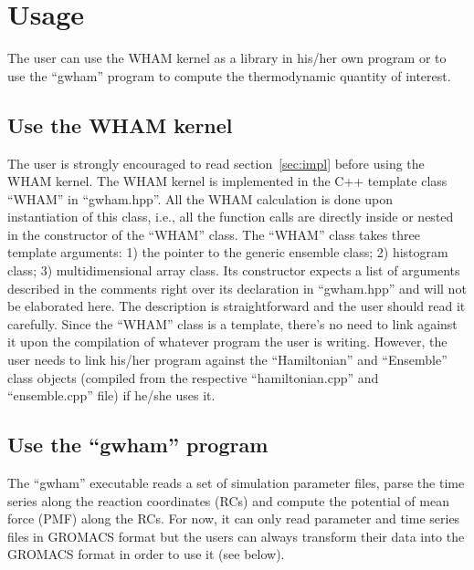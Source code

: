 \section{Usage} \label{sec:usage}
The user can use the WHAM kernel as a library in his/her own
program or to use the ``gwham'' program to compute the thermodynamic
quantity of interest. 

\subsection{Use the WHAM kernel}
The user is strongly encouraged to read section~\ref{sec:impl} before using the
WHAM kernel. The WHAM kernel is implemented in the C++ template class ``WHAM''
in ``gwham.hpp''. All the WHAM calculation is done upon instantiation of this
class, i.e., all the function calls are directly inside or nested in the
constructor of the ``WHAM'' class. The ``WHAM'' class takes three template
arguments: 1) the pointer to the generic ensemble class; 2) histogram class; 3)
multidimensional array class. Its constructor expects a list of arguments
described in the comments right over its declaration in ``gwham.hpp'' and will
not be elaborated here. The description is straightforward and the user should
read it carefully. Since the ``WHAM'' class is a template, there's no need to 
link against it upon the compilation of whatever program the user is writing. 
However, the user needs to link his/her program against the ``Hamiltonian'' 
and ``Ensemble'' class objects (compiled from the respective ``hamiltonian.cpp''
and ``ensemble.cpp'' file) if he/she uses it.

\subsection{Use the ``gwham'' program}
The ``gwham'' executable reads a set of simulation parameter files, parse the
time series along the reaction coordinates (RCs) and compute the potential of
mean force (PMF) along the RCs. For now, it can only read parameter and 
time series files in GROMACS format but the users can always transform their 
data into the GROMACS format in order to use it (see below).

